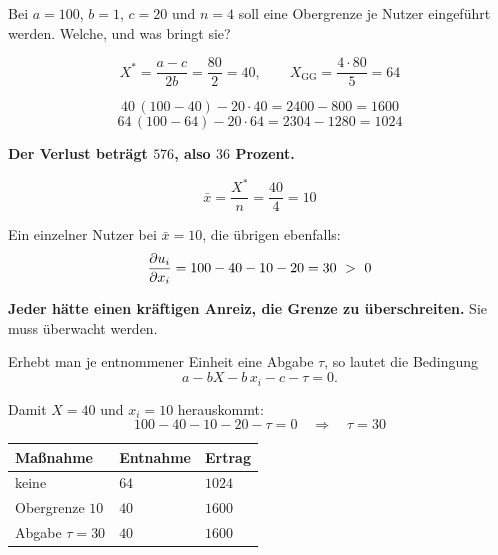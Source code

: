\begin{aufgabe}
Bei $a=100$, $b=1$, $c=20$ und $n=4$ soll eine Obergrenze je Nutzer eingeführt werden. Welche, und was bringt sie?

\loesung
{}
\[ X^{*} = \frac{a-c}{2b} = \frac{80}{2} = 40, \qquad X_{\text{GG}} = \frac{4\cdot80}{5} = 64 \]

\[ 40\,(100-40) - 20\cdot40 = 2400 - 800 = 1600 \]
\[ 64\,(100-64) - 20\cdot64 = 2304 - 1280 = 1024 \]

\begin{center}
\begin{minipage}{0.9\textwidth}
\textbf{Der Verlust beträgt $576$, also $36$ Prozent.}
\end{minipage}
\end{center}

\[ \bar x = \frac{X^{*}}{n} = \frac{40}{4} = 10 \]

Ein einzelner Nutzer bei $\bar x = 10$, die übrigen ebenfalls:
\[ \frac{\partial u_i}{\partial x_i} = 100 - 40 - 10 - 20 = 30 \ >\ 0 \]

\begin{center}
\begin{minipage}{0.9\textwidth}
\textbf{Jeder hätte einen kräftigen Anreiz, die Grenze zu überschreiten.} Sie muss überwacht werden.
\end{minipage}
\end{center}

Erhebt man je entnommener Einheit eine Abgabe $\tau$, so lautet die Bedingung
\[ a - bX - b\,x_i - c - \tau = 0 . \]

Damit $X = 40$ und $x_i = 10$ herauskommt:
\[ 100 - 40 - 10 - 20 - \tau = 0 \quad\Longrightarrow\quad \tau = 30 \]

\begin{center}
{\small
\renewcommand{\arraystretch}{1.5}
\begin{tabular}{@{}P{2.4cm}P{2.2cm}P{2.6cm}@{}}
\toprule
\textbf{Maßnahme} & \textbf{Entnahme} & \textbf{Ertrag}\\
\midrule
keine & $64$ & $1024$\\
Obergrenze $10$ & $40$ & $1600$\\
Abgabe $\tau=30$ & $40$ & $1600$\\
\bottomrule
\end{tabular}}
\end{center}


\end{aufgabe}
